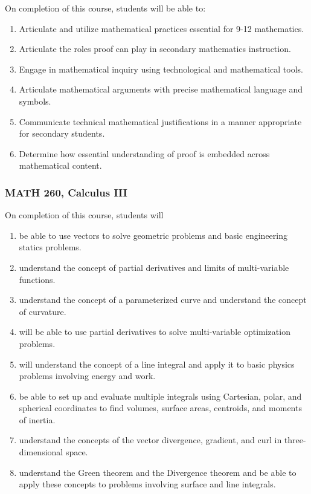 \documentclass[11pt]{article}
\newenvironment{alphalist}{
\begin{enumerate}[label=(\arabic*),widest=107 ,leftmargin=25pt, itemsep=0pt]}
{\end{enumerate}}
\begin{document}
On completion of this course, students will be able to:
\begin{alphalist}
\item Articulate and utilize mathematical practices essential for 9-12 mathematics.  
\item Articulate the roles proof can play in secondary mathematics instruction.
\item Engage in mathematical inquiry using technological and mathematical tools.
\item Articulate mathematical arguments with precise mathematical language and symbols.
\item Communicate technical mathematical justifications in a manner appropriate for secondary students.
\item Determine how essential understanding of proof is embedded across mathematical content.
\end{alphalist}

\subsubsection*{MATH 260, Calculus III}


On completion of this course, students will 
\begin{alphalist} 
    \item be able to use vectors to solve geometric problems and basic engineering statics problems.
    \item understand the concept of partial derivatives and limits of multi-variable functions.
    \item understand the concept of a parameterized curve and understand the concept of curvature.
    \item will be able to use partial derivatives to solve multi-variable optimization problems.
    \item will understand the concept of a line integral and apply it to basic physics problems involving energy and work.
    \item be able to set up and evaluate multiple integrals using Cartesian, polar, and spherical coordinates to find volumes, 
    surface areas, centroids, and moments of inertia.
    \item understand the concepts of the vector divergence, gradient, and curl in 
    three-dimensional space.
    \item understand the Green theorem and the Divergence theorem and be able to 
    apply these concepts to problems involving surface and line integrals.
\end{alphalist}
\end{document}
